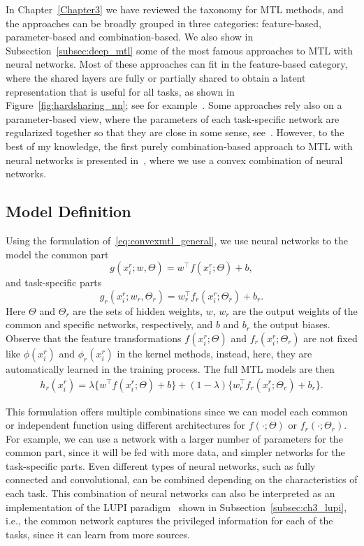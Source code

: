 %
In Chapter~\ref{Chapter3} we have reviewed the taxonomy for MTL methods, and the approaches can be broadly grouped in three categories: feature-based, parameter-based and combination-based. 
We also show in Subsection~\ref{subsec:deep_mtl} some of the most famous approaches to MTL with neural networks. Most of these approaches can fit in the feature-based category, where the shared layers are fully or partially shared to obtain a latent representation that is useful for all tasks, as shown in Figure~\ref{fig:hardsharing_nn}; see for example~\cite{Caruana97, MisraSGH16,RuderBAS17}. Some approaches rely also on a parameter-based view, where the parameters of each task-specific network are regularized together so that they are close in some sense, see~\cite{Long015a, YangH17a}.
However, to the best of my knowledge, the first purely combination-based approach to MTL with neural networks is presented in~\cite{RuizAD22_hais}, where we use a convex combination of neural networks.



\subsection{Model Definition}
Using the formulation of~\eqref{eq:convexmtl_general}, we use neural networks to the model the common part 
$$ g(x_i^r; w, \Theta) = w^\intercal f(x_i^r; \Theta) + b,$$
and task-specific parts
$$ g_r(x_i^r; w_r, \Theta_r) =  w_r^\intercal f_r(x_i^r; \Theta_r) + b_r.$$
Here $\Theta$ and $\Theta_r$ are the sets of hidden weights, $w$, $w_r$ are the output weights of the common and specific networks, respectively, and $b$ and $b_r$ the output biases.
Observe that the feature transformations $ f(x_i^r; \Theta)$ and $f_r(x_i^r; \Theta_r)$ are not fixed like $\phi(x_i^r)$ and $\phi_r(x_i^r)$ in the kernel methods, instead, here, they are automatically learned in the training process.
The full MTL models are then
\begin{equation}
    \label{eq:convexmtl_nn}
    \begin{aligned}
        h_r(x_i^r)
       = \lambda \lbrace w^\intercal f(x_i^r; \Theta) + b \rbrace + (1 - \lambda) \lbrace w_r^\intercal f_r(x_i^r; \Theta_r) + b_r \rbrace.
    \end{aligned}    
\end{equation}

This formulation offers multiple combinations since we can model each common or independent function using different architectures for $f(\cdot; \Theta)$ or $f_r(\cdot; \Theta_r)$.
%
For example, we can use a network with a larger number of parameters for the common part, since it will be fed with more data, and simpler networks for the task-specific parts.
%
Even different types of neural networks, such as fully connected and convolutional, can be combined depending on the characteristics of each task.
This combination of neural networks can also be interpreted as an implementation of the LUPI paradigm~\citep{VapnikI15a} shown in Subsection~\ref{subsec:ch3_lupi}, i.e., the common network captures the privileged information for each of the tasks, since it can learn from more sources.
%

